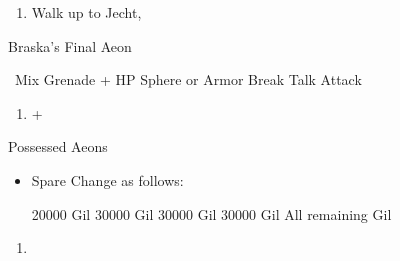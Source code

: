 \begin{enumerate}[resume]
    \item Walk up to Jecht, \cs[4:30]
\end{enumerate}
\begin{battle}[180000]{Braska's Final Aeon}
    \begin{itemize}
        \switch{\yuna}{\rikku}
        \rikkuf \od\ Mix Grenade + HP Sphere or Armor Break
        \tidusf Talk
        \switch{\auron}{\yuna}
        \summon{\bahamut}
        \bahamutf Attack
    \end{itemize}
\end{battle}
\begin{enumerate}[resume]
    \item \cs+\skippablefmv[4:00]
\end{enumerate}
\begin{battle}{Possessed Aeons}
    \begin{itemize}
        \item Spare Change as follows:
        \begin{itemize}
            \valeforf \num{20000} Gil
            \ifritf \num{30000} Gil
            \ixionf \num{30000} Gil
            \shivaf \num{30000} Gil
            \bahamutf All remaining Gil
        \end{itemize}
    \end{itemize}
\end{battle}
\begin{enumerate}[resume]
    \item \cs[1:40]
\end{enumerate}
\colend
